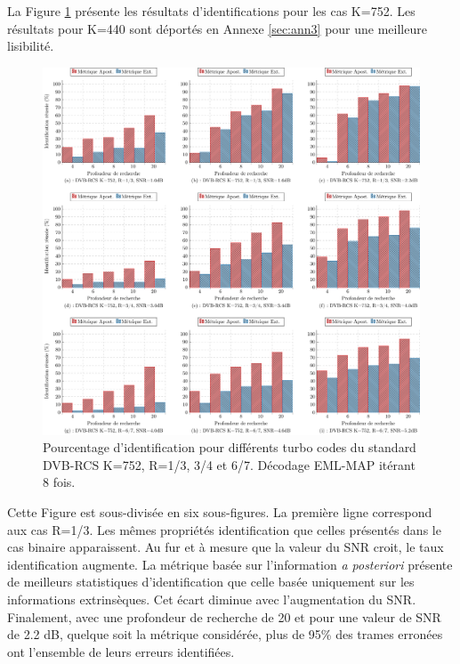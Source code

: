 La Figure \ref{fig:dvb752} présente les résultats d'identifications pour les cas K=752. Les résultats pour K=440 sont 
déportés en Annexe \ref{sec:ann3} pour une meilleure lisibilité.
\begin{figure}[!h]
	\centering
	\hspace*{-1cm}
	\includegraphics[width=1.05\textwidth]{main/ch3_fig/id2/dvb/tikz/752.pdf}
	\vspace*{-1em}
	\caption{Pourcentage d'identification pour différents turbo codes du standard DVB-RCS K=752, R=1/3, 3/4 et 6/7.
	Décodage EML-MAP itérant 8 fois. \label{fig:dvb752}}
\end{figure}
Cette Figure est sous-divisée en six sous-figures. La première ligne correspond aux cas R=1/3. Les mêmes propriétés 
identification que celles présentés dans le cas binaire apparaissent. Au fur et à mesure que la valeur du SNR croit, le 
taux identification augmente. La métrique basée sur l'information \textit{a posteriori} présente de meilleurs statistiques
d'identification que celle basée uniquement sur les informations extrinsèques. Cet écart diminue avec l'augmentation du SNR.
Finalement, avec une profondeur de recherche de 20 et pour une valeur de SNR de 2.2 dB, quelque soit la métrique considérée, 
plus de 95\% des trames erronées ont l'ensemble de leurs erreurs identifiées.

